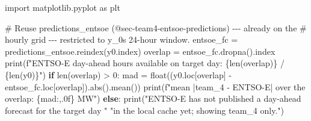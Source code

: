 \documentclass[
  english,
  letterpaper,
]{scrbook}
\newenvironment{Shaded}{\begin{snugshade}}{\end{snugshade}}
\newcommand{\BuiltInTok}[1]{\textcolor[rgb]{0.00,0.23,0.31}{#1}}
\newcommand{\CommentTok}[1]{\textcolor[rgb]{0.37,0.37,0.37}{#1}}
\newcommand{\ControlFlowTok}[1]{\textcolor[rgb]{0.00,0.23,0.31}{\textbf{#1}}}
\newcommand{\DecValTok}[1]{\textcolor[rgb]{0.68,0.00,0.00}{#1}}
\newcommand{\ImportTok}[1]{\textcolor[rgb]{0.00,0.46,0.62}{#1}}
\newcommand{\NormalTok}[1]{\textcolor[rgb]{0.00,0.23,0.31}{#1}}
\newcommand{\OperatorTok}[1]{\textcolor[rgb]{0.37,0.37,0.37}{#1}}
\newcommand{\SpecialCharTok}[1]{\textcolor[rgb]{0.37,0.37,0.37}{#1}}
\newcommand{\SpecialStringTok}[1]{\textcolor[rgb]{0.13,0.47,0.30}{#1}}
\newcommand{\StringTok}[1]{\textcolor[rgb]{0.13,0.47,0.30}{#1}}
\begin{document}
\begin{Shaded}
\begin{Highlighting}[]
\ImportTok{import}\NormalTok{ matplotlib.pyplot }\ImportTok{as}\NormalTok{ plt}

\CommentTok{\# Reuse predictions\_entsoe (@sec{-}team4{-}entsoe{-}predictions) {-}{-}{-} already on the}
\CommentTok{\# hourly grid {-}{-}{-} restricted to y\_0\textquotesingle{}s 24{-}hour window.}
\NormalTok{entsoe\_fc }\OperatorTok{=}\NormalTok{ predictions\_entsoe.reindex(y0.index)}
\NormalTok{overlap }\OperatorTok{=}\NormalTok{ entsoe\_fc.dropna().index}
\BuiltInTok{print}\NormalTok{(}\SpecialStringTok{f"ENTSO{-}E day{-}ahead hours available on target day: }\SpecialCharTok{\{}\BuiltInTok{len}\NormalTok{(overlap)}\SpecialCharTok{\}}\SpecialStringTok{ / }\SpecialCharTok{\{}\BuiltInTok{len}\NormalTok{(y0)}\SpecialCharTok{\}}\SpecialStringTok{"}\NormalTok{)}
\ControlFlowTok{if} \BuiltInTok{len}\NormalTok{(overlap) }\OperatorTok{\textgreater{}} \DecValTok{0}\NormalTok{:}
\NormalTok{    mad }\OperatorTok{=} \BuiltInTok{float}\NormalTok{((y0.loc[overlap] }\OperatorTok{{-}}\NormalTok{ entsoe\_fc.loc[overlap]).}\BuiltInTok{abs}\NormalTok{().mean())}
    \BuiltInTok{print}\NormalTok{(}\SpecialStringTok{f"mean |team\_4 {-} ENTSO{-}E| over the overlap: }\SpecialCharTok{\{}\NormalTok{mad}\SpecialCharTok{:,.0f\}}\SpecialStringTok{ MW"}\NormalTok{)}
\ControlFlowTok{else}\NormalTok{:}
    \BuiltInTok{print}\NormalTok{(}\StringTok{"ENTSO{-}E has not published a day{-}ahead forecast for the target day "}
          \StringTok{"in the local cache yet; showing team\_4 only."}\NormalTok{)}


\end{Highlighting}
\end{Shaded}
\end{document}
